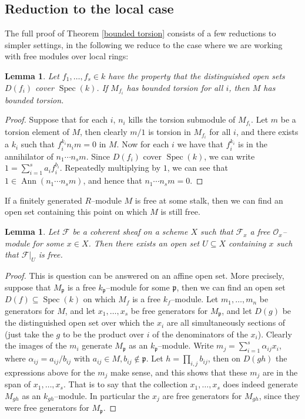 \documentclass{article}
\theoremstyle{plain}
\newtheorem{Lemma}[Th]{Lemma}
\theoremstyle{definition}
\DeclareMathOperator{\Spec}{Spec}
\DeclareMathOperator{\Ann}{Ann}
\newcommand{\mf}{\mathfrak}
\begin{document}
\subsection*{Reduction to the local case}

The full proof of Theorem \ref{bounded torsion} consists of a few reductions to simpler settings, in the following we reduce to the case where we are working with free modules over local rings:

\begin{Lemma}\label{open cover}
    Let $f_1, \dots, f_s \in k$ have the property that the distinguished open sets $D(f_i)$ cover $\Spec(k)$. If $M_{f_i}$ has bounded torsion for all $i$, then $M$ has bounded torsion.
\end{Lemma}

\begin{proof}
    Suppose that for each $i$, $n_i$ kills the torsion submodule of $M_{f_i}$. Let $m$ be a torsion element of $M$, then clearly $m/1$ is torsion in $M_{f_i}$ for all $i$, and there exists a $k_i$ such that $f_i^{k_i}n_im=0$ in $M$. Now for each $i$ we have that $f_i^{k_i}$ is in the annihilator of $n_1\cdots n_s m$. Since $D(f_i)$ cover $\Spec(k)$, we can write $1=\sum_{i=1}^s a_i f_i^{b_i}$. Repeatedly multiplying by $1$, we can see that $1\in \Ann(n_1\cdots n_s m)$, and hence that  $n_1\cdots n_s m=0$.
\end{proof}

If a finitely generated $R$--module $M$ is free at some stalk, then we can find an open set containing this point on which $M$ is still free.
\begin{Lemma}\label{free over open set}
    Let $\mathscr{F}$ be a coherent sheaf on a scheme $X$ such that $\mathscr{F}_{x}$ a free $\mathcal{O}_x$--module for some $x\in X$. Then there exists an open set $U\subseteq X$ containing $x$ such that $\mathscr{F}|_U$ is free.
\end{Lemma}
\begin{proof}
 
This is question can be answered on an affine open set. More precisely, suppose that $M_{\mf{p}}$ is a free $k_\mf{p}$--module for some $\mf{p}$, then we can find an open set $D(f) \subseteq \Spec(k)$ on which $M_f$ is a free $k_f$--module. Let $m_1,\dots, m_n$ be generators for $M$, and let $x_1, \dots, x_s$ be free generators for $M_{\mf{p}}$, and let $D(g)$ be the distinguished open set over which the $x_i$ are all simultaneously sections of (just take the $g$ to be the product over $i$ of the denominators of the $x_i$). Clearly the images of the $m_i$ generate $M_{\mf{p}}$ as an $k_\mf{p}$--module. Write $m_j=\sum_{i=1}^s \alpha_{ij} x_i$, where $\alpha_{ij}=a_{ij}/b_{ij}$ with $a_{ij}\in M, b_{ij}\notin \mf{p}$. Let $h=\prod_{i,j} b_{ij}$, then on $D(gh)$ the expressions above for the $m_j$ make sense, and this shows that these $m_j$ are in the span of $x_1,\dots, x_s$. That is to say that the collection $x_1,\dots, x_s$ does indeed generate $M_{gh}$ as an $k_{gh}$--module. In particular the $x_j$ are free generators for $M_{gh}$, since they  were free generators for $M_\mf{p}$. 
\end{proof}
\end{document}

